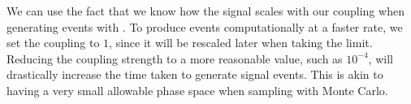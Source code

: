 We can use the fact that we know how the signal scales with our coupling when generating events with \madgraph.
To produce events computationally at a faster rate, we set the coupling to $1$, since it will be rescaled later when taking the limit.
Reducing the coupling strength to a more reasonable value, such as $10^{-4}$, will drastically increase the time taken to generate signal events.
This is akin to having a very small allowable phase space when sampling with Monte Carlo.
